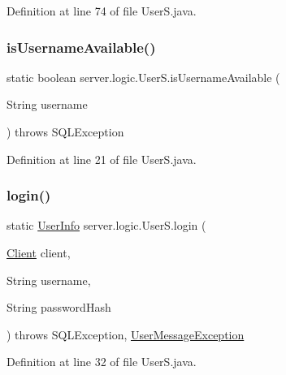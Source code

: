 Definition at line 74 of file User\+S.\+java.

\hypertarget{classserver_1_1logic_1_1_user_s_a33903c8aa907a94d28bfa4e5200de5c0}{}\label{classserver_1_1logic_1_1_user_s_a33903c8aa907a94d28bfa4e5200de5c0} 
\subsubsection{\texorpdfstring{is\+Username\+Available()}{isUsernameAvailable()}}
{\footnotesize\ttfamily static boolean server.\+logic.\+User\+S.\+is\+Username\+Available (\begin{DoxyParamCaption}\item[{String}]{username }\end{DoxyParamCaption}) throws S\+Q\+L\+Exception\hspace{0.3cm}{\ttfamily [static]}}



Definition at line 21 of file User\+S.\+java.

\hypertarget{classserver_1_1logic_1_1_user_s_a341ba5a2821e041762a4ca53a0c7b4b2}{}\label{classserver_1_1logic_1_1_user_s_a341ba5a2821e041762a4ca53a0c7b4b2} 
\subsubsection{\texorpdfstring{login()}{login()}}
{\footnotesize\ttfamily static \hyperlink{classsharedlib_1_1tuples_1_1_user_info}{User\+Info} server.\+logic.\+User\+S.\+login (\begin{DoxyParamCaption}\item[{\hyperlink{classserver_1_1conn_1_1_client}{Client}}]{client,  }\item[{String}]{username,  }\item[{String}]{password\+Hash }\end{DoxyParamCaption}) throws S\+Q\+L\+Exception, \hyperlink{classsharedlib_1_1exceptions_1_1_user_message_exception}{User\+Message\+Exception}\hspace{0.3cm}{\ttfamily [static]}}



Definition at line 32 of file User\+S.\+java.


